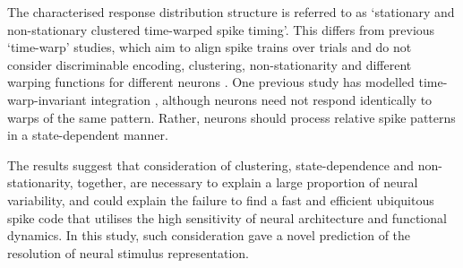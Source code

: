 \documentclass{article}
\begin{document}
The characterised response distribution structure is referred to as `stationary and non-stationary clustered time-warped spike timing'. This differs from previous `time-warp' studies, which aim to align spike trains over trials and do not consider discriminable encoding, clustering, non-stationarity and different warping functions for different neurons \cite{williams2020discovering}. One previous study has modelled time-warp-invariant integration \cite{gutig2009time}, although neurons need not respond identically to warps of the same pattern. Rather, neurons should process relative spike patterns in a state-dependent manner.

The results suggest that consideration of clustering, state-dependence and non-stationarity, together, are necessary to explain a large proportion of neural variability, and could explain the failure to find a fast and efficient ubiquitous spike code that utilises the high sensitivity of neural architecture and functional dynamics. In this study, such consideration gave a novel prediction of the resolution of neural stimulus representation. 








\end{document}
